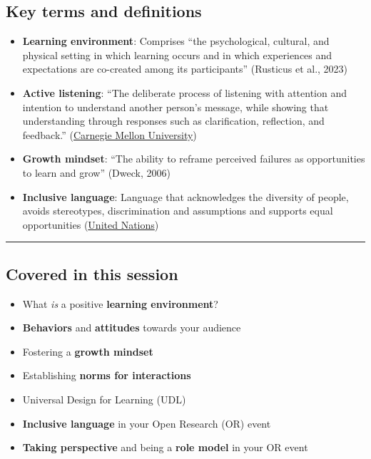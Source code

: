 \documentclass[
  letterpaper,
  DIV=11,
  numbers=noendperiod]{scrartcl}
\providecommand{\tightlist}{%
  \setlength{\itemsep}{0pt}\setlength{\parskip}{0pt}}
\begin{document}
\subsection{Key terms and
definitions}\label{key-terms-and-definitions-1}

\begin{itemize}
\tightlist
\item
  \textbf{Learning environment}: Comprises ``the psychological,
  cultural, and physical setting in which learning occurs and in which
  experiences and expectations are co-created among its participants''
  (Rusticus et al., 2023)
\item
  \textbf{Active listening}: ``The deliberate process of listening with
  attention and intention to understand another person's message, while
  showing that understanding through responses such as clarification,
  reflection, and feedback.''
  (\href{https://www.cmu.edu/student-affairs/civility/resources/active-listening.html}{Carnegie
  Mellon University})
\item
  \textbf{Growth mindset}: ``The ability to reframe perceived failures
  as opportunities to learn and grow'' (Dweck, 2006)
\item
  \textbf{Inclusive language}: Language that acknowledges the diversity
  of people, avoids stereotypes, discrimination and assumptions and
  supports equal opportunities
  (\href{https://www.un.org/en/gender-inclusive-language/}{United
  Nations})
\end{itemize}

\begin{center}\rule{0.5\linewidth}{0.5pt}\end{center}

\subsection{Covered in this session}\label{covered-in-this-session}

\begin{itemize}
\tightlist
\item
  What \emph{is} a positive \textbf{learning environment}?
\item
  \textbf{Behaviors} and \textbf{attitudes} towards your audience
\item
  Fostering a \textbf{growth mindset}
\item
  Establishing \textbf{norms for interactions}
\item
  Universal Design for Learning (UDL)
\item
  \textbf{Inclusive language} in your Open Research (OR) event
\item
  \textbf{Taking perspective} and being a \textbf{role model} in your OR
  event
\end{itemize}
\end{document}
